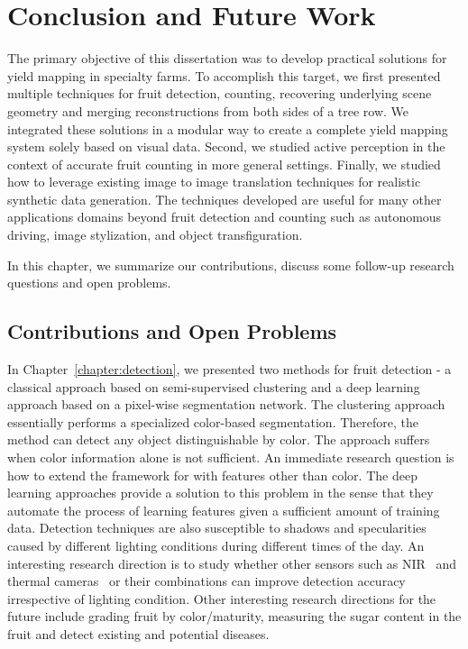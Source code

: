 \chapter{Conclusion and Future Work}
\label{conclusion_chapter}

The primary objective of this dissertation was to develop practical solutions for yield mapping in specialty farms. To accomplish this target, we first presented multiple techniques for fruit detection, counting, recovering underlying scene geometry and merging reconstructions from both sides of a tree row. We integrated these solutions in a modular way to create a complete yield mapping system solely based on visual data. Second, we studied active perception in the context of accurate fruit counting in more general settings. Finally, we studied how to leverage existing image to image translation techniques for realistic synthetic data generation. The techniques developed are useful for many other applications domains beyond fruit detection and counting such as autonomous driving, image stylization, and object transfiguration.

In this chapter, we summarize our contributions, discuss some follow-up research questions and open problems.

\section{Contributions and Open Problems}

In Chapter~\ref{chapter:detection}, we presented two methods for fruit detection - a classical approach based on semi-supervised clustering and a deep learning approach based on a pixel-wise segmentation network. The clustering approach essentially performs a specialized color-based segmentation. Therefore, the method can detect any object distinguishable by color. The approach suffers when color information alone is not sufficient. An immediate research question is how to extend the framework for with features other than color. The deep learning approaches provide a solution to this problem in the sense that they automate the process of learning features given a sufficient amount of training data. Detection techniques are also susceptible to shadows and specularities caused by different lighting conditions during different times of the day. An interesting research direction is to study whether other sensors such as NIR~\cite{bachmann2013micro} and thermal cameras~\cite{vadivambal2011applications} or their combinations can improve detection accuracy irrespective of lighting condition. Other interesting research directions for the future include grading fruit by color/maturity, measuring the sugar content in the fruit and detect existing and potential diseases.


